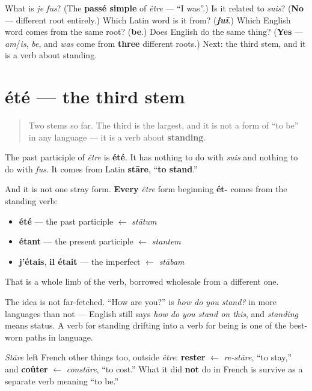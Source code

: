 \begin{tcolorbox}[breakable,colback=teal!4,colframe=teal!35!black,title={Before you move on}]
What is \emph{je fus}? (The \textbf{passé simple} of \emph{être} — \textquotedblleft{}I was\textquotedblright{}.) Is it related to \emph{suis}? (\textbf{No} — different root entirely.) Which Latin word is it from? (\emph{\textbf{fuī}}.) Which English word comes from the same root? (\textbf{be}.) Does English do the same thing? (\textbf{Yes} — \emph{am}/\emph{is}, \emph{be}, and \emph{was} come from \textbf{three} different roots.) Next: the third stem, and it is a verb about standing.
\end{tcolorbox}
\section[été]{été — the third stem}

\label{lesson:FR-C16-stare}



\begin{quote}
Two stems so far. The third is the largest, and it is not a form of \textquotedblleft{}to be\textquotedblright{} in any language — it is a verb about \textbf{standing}.
\end{quote}

\begin{cousinweb}
The past participle of \emph{être} is \textbf{été}. It has nothing to do with \emph{suis} and nothing to do with \emph{fus}. It comes from Latin \textbf{stāre}, \textquotedblleft{}\textbf{to stand}.\textquotedblright{}

And it is not one stray form. \textbf{Every} \emph{être} form beginning \textbf{ét-} comes from the standing verb:

\begin{itemize}
\raggedright
  \item \textbf{été} — the past participle $\leftarrow$ \emph{stātum}
  \item \textbf{étant} — the present participle $\leftarrow$ \emph{stantem}
  \item \textbf{j'étais}, \textbf{il était} — the imperfect $\leftarrow$ \emph{stābam}
\end{itemize}

That is a whole limb of the verb, borrowed wholesale from a different one.

The idea is not far-fetched. \textquotedblleft{}How are you?\textquotedblright{} is \emph{how do you stand?} in more languages than not — English still says \emph{how do you stand on this}, and \emph{standing} means status. A verb for standing drifting into a verb for being is one of the best-worn paths in language.

\emph{Stāre} left French other things too, outside \emph{être}: \textbf{rester} $\leftarrow$ \emph{re-stāre}, \textquotedblleft{}to stay,\textquotedblright{} and \textbf{coûter} $\leftarrow$ \emph{constāre}, \textquotedblleft{}to cost.\textquotedblright{} What it did \textbf{not} do in French is survive as a separate verb meaning \textquotedblleft{}to be.\textquotedblright{}
\end{cousinweb}

